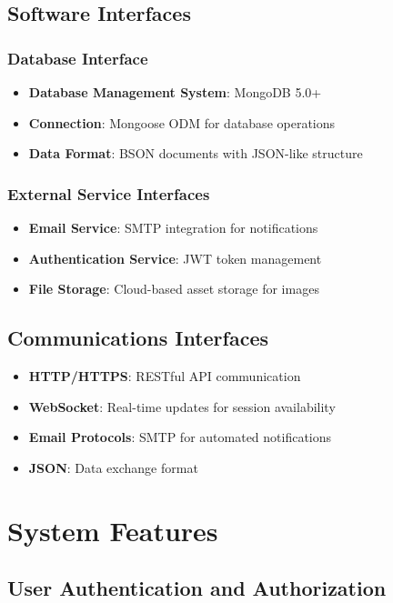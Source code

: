 \documentclass[12pt,a4paper]{article}
\begin{document}
\subsection{Software Interfaces}
\subsubsection{Database Interface}
\begin{itemize}
    \item \textbf{Database Management System}: MongoDB 5.0+
    \item \textbf{Connection}: Mongoose ODM for database operations
    \item \textbf{Data Format}: BSON documents with JSON-like structure
\end{itemize}

\subsubsection{External Service Interfaces}
\begin{itemize}
    \item \textbf{Email Service}: SMTP integration for notifications
    \item \textbf{Authentication Service}: JWT token management
    \item \textbf{File Storage}: Cloud-based asset storage for images
\end{itemize}

\subsection{Communications Interfaces}
\begin{itemize}
    \item \textbf{HTTP/HTTPS}: RESTful API communication
    \item \textbf{WebSocket}: Real-time updates for session availability
    \item \textbf{Email Protocols}: SMTP for automated notifications
    \item \textbf{JSON}: Data exchange format
\end{itemize}

\section{System Features}

\subsection{User Authentication and Authorization}
\end{document}
